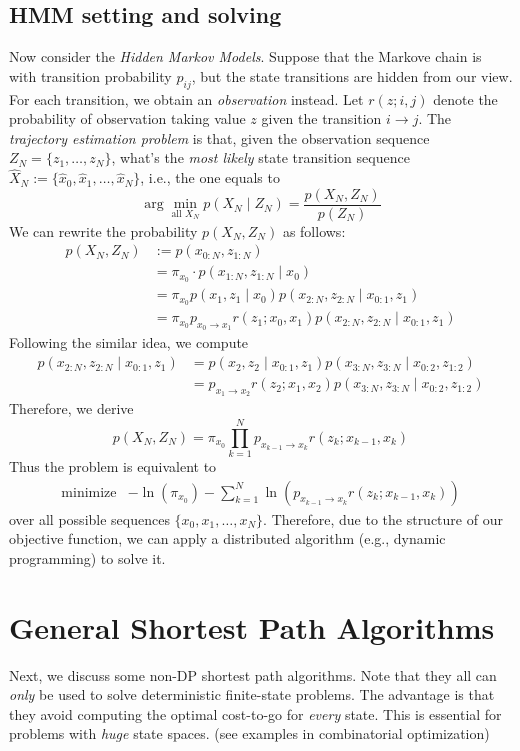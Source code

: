 \subsection{HMM setting and solving}
Now consider the \emph{Hidden Markov Models}. Suppose that the Markove chain is with transition probability $p_{ij}$, but the state transitions are hidden from our view. For each transition, we obtain an \emph{observation} instead. Let $r(z;i,j)$ denote the probability of observation taking value $z$ given the transition $i\to j$. The \emph{trajectory estimation problem} is that, given the observation sequence $Z_N=\{z_1,\dots,z_N\}$, what's the \emph{most likely} state transition sequence $\hat{X}_N:=\{\hat x_0,\hat x_1,\dots,\hat x_N\}$, i.e., the one equals to
\[
\arg\min_{\text{all }X_N}p(X_N\mid Z_N)=\frac{p(X_N,Z_N)}{p(Z_N)}
\]
We can rewrite the probability $p(X_N,Z_N)$ as follows:
\begin{align*}
p(X_N,Z_N)&:=p(x_{0:N},z_{1:N})\\
&=\pi_{x_0}\cdot p(x_{1:N},z_{1:N}\mid x_0)\\
&=\pi_{x_0}p(x_1,z_1\mid x_0)p(x_{2:N},z_{2:N}\mid x_{0:1},z_1)\\
&=\pi_{x_0}p_{x_0\to x_1}r(z_1;x_0,x_1)p(x_{2:N},z_{2:N}\mid x_{0:1},z_1)
\end{align*}
Following the similar idea, we compute
\begin{align*}
p(x_{2:N},z_{2:N}\mid x_{0:1},z_1)&=p(x_{2},z_2\mid x_{0:1},z_1)p(x_{3:N},z_{3:N}\mid x_{0:2},z_{1:2})\\
&=p_{x_1\to x_2}r(z_2;x_1,x_2)p(x_{3:N},z_{3:N}\mid x_{0:2},z_{1:2})
\end{align*}
Therefore, we derive
\[
p(X_N,Z_N)=\pi_{x_0}\prod_{k=1}^Np_{x_{k-1}\to x_k}
r(z_k;x_{k-1},x_k)
\]
Thus the problem is equivalent to
\[
\begin{array}{ll}
\mbox{minimize}
&
-\ln (\pi_{x_0})
-
\sum_{k=1}^N
\ln\left(p_{x_{k-1}\to x_k}
r(z_k;x_{k-1},x_k)
\right)
\end{array}
\]
over all possible sequences $\{x_0,x_1,\dots,x_N\}$. Therefore, due to the structure of our objective function, we can apply a distributed algorithm (e.g., dynamic programming) to solve it.

\section{General Shortest Path Algorithms}
Next, we discuss some non-DP shortest path algorithms. Note that they all can \emph{only} be used to solve deterministic finite-state problems.
The advantage is that they avoid computing the optimal cost-to-go for \emph{every} state.
This is essential for problems with \emph{huge} state spaces. (see examples in combinatorial optimization)

